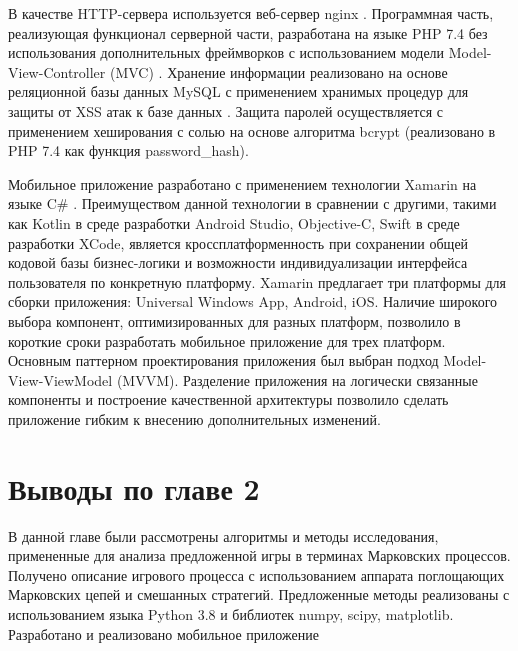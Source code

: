 В качестве HTTP-сервера используется веб-сервер nginx \cite{}. Программная часть, реализующая функционал серверной части, 
разработана на языке PHP 7.4 \cite{} без использования дополнительных фреймворков с использованием модели Model-View-Controller (MVC) \cite{}. 
Хранение информации реализовано на основе реляционной базы данных MySQL с применением хранимых процедур для защиты от XSS атак к базе данных \cite{}.
Защита паролей осуществляется с применением хеширования с солью на основе алгоритма bcrypt (реализовано в PHP 7.4 как функция password_hash).

Мобильное приложение разработано с применением технологии Xamarin на языке C# \cite{}. Преимуществом данной технологии в сравнении с 
другими, такими как Kotlin в среде разработки Android Studio, Objective-C, Swift в среде разработки XCode, является кроссплатформенность
при сохранении общей кодовой базы бизнес-логики и возможности индивидуализации интерфейса пользователя по конкретную платформу.
Xamarin предлагает три платформы для сборки приложения: Universal Windows App, Android, iOS. Наличие широкого выбора компонент,
оптимизированных для разных платформ, позволило в короткие сроки разработать мобильное приложение для трех платформ.
Основным паттерном проектирования приложения был выбран подход Model-View-ViewModel (MVVM). Разделение приложения на логически
связанные компоненты и построение качественной архитектуры позволило сделать приложение гибким к внесению дополнительных изменений.

\section{Выводы по главе 2}\label{sec:ch2/sec4}

В данной главе были рассмотрены алгоритмы и методы исследования, примененные для анализа 
предложенной игры в терминах Марковских процессов. Получено описание игрового процесса 
с использованием аппарата поглощающих Марковских цепей и смешанных стратегий.
Предложенные методы реализованы с использованием языка Python 3.8 и библиотек numpy, scipy, matplotlib.
Разработано и реализовано мобильное приложение 